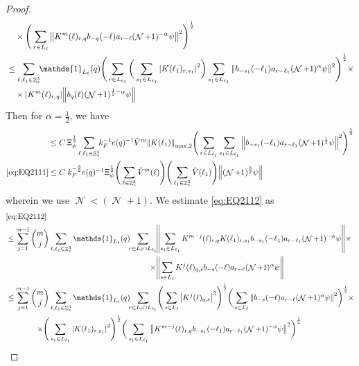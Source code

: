 \documentclass[sn-mathphys, Numbered ,a4paper]{sn-jnl}%
\DeclareMathOperator{\Z}{\mathbb{Z}}
\DeclareMathOperator{\NN}{\mathcal{N}}
\newcommand{\half}{\frac{1}{2}}
\theoremstyle{plain}
\theoremstyle{definition}
\theoremstyle{remark}
\theoremstyle{plain}
\theoremstyle{definition}
\theoremstyle{remark}
\begin{document}
\begin{proof}
\begin{align}
 	&\quad \times \Bigg( \sum\limits_{r \in L_\ell}  \norm{  K^{m}(\ell)_{r,q}  b_{-q}(-\ell) a_{r-\ell} (\NN+1)^{-\alpha}\psi }^2\Bigg)^\half \nonumber\\
 	&\leq \sum\limits_{\ell,\ell_1 \in \Z^3_*} \!\!\mathds{1}_{L_\ell}(q) \Bigg( \sum\limits_{r \in L_{\ell_1}} \bigg( \sum\limits_{s_1 \in L_{\ell_1}}\abs{K(\ell_1)_{r,s_1}}^2\bigg) \sum\limits_{s_1 \in L_{\ell_1}} \norm{ b_{-s_1}(-\ell_1)  a_{r-\ell_1} (\NN+1)^{\alpha}\psi}^2\Bigg)^\half \times\nonumber\\
 	&\quad \times  \abs{  K^{m}(\ell)_{r,q}} \norm{b_{q}(\ell) (\NN+1)^{\half-\alpha}\psi } \nonumber\\
\end{align}
	Then for $\alpha = \half$, we have 
\begin{align}
 	&\leq C\,\Xi_{\psi}^\half \sum\limits_{\ell,\ell_1 \in \Z^3_*} \!\! k_F^{-1} e(q)^{-1} \hat{V}^{m} \norm{K(\ell_1)}_{\mathrm{max,2}}  \Bigg( \sum\limits_{r \in L_{\ell_1}} \sum\limits_{s_1 \in L_{\ell_1}} \norm{ b_{-s_1}(-\ell_1)  a_{r-\ell_1} (\NN+1)^{\half}\psi}^2\Bigg)^\half \nonumber\\
 	\eqref{eq:EQ2111}&\leq C\; k_F^{-\frac{3}{2}} e(q)^{-1} \Xi_{\psi}^\half \Bigg(\sum\limits_{\ell \in \Z^3_*}  \hat{V}^{m}(\ell)\Bigg) \Bigg(\sum\limits_{\ell_1 \in \Z^3_*} \hat{V}(\ell_1) \Bigg) \norm{ (\NN+1)^{\frac{3}{2}}\psi}  \label{eq:estEQ2111} 
 \end{align}
 wherein we use $\NN<(\NN+1)$. We estimate \eqref{eq:EQ2112} as 
  \begin{alignat}{2}
  	&\eqref{eq:EQ2112}\nonumber\\
  	&\leq \sum\limits_{j=1}^{m-1} {{m}\choose j} \sum\limits_{\ell, \ell_1\in \Z^3_*} \mathds{1}_{L_{\ell}}(q)\!\! \begin{aligned}[t]
  	\sum\limits_{r\in L_{\ell} \cap L_{\ell_1}}\! &\norm{  \sum\limits_{s_1 \in L_{\ell_1}} K^{m-j}(\ell)_{r,q} K(\ell_1)_{r,s_1} b_{-s_1}(-\ell_1) a_{r-\ell_1} (\NN+1)^{-\alpha}\psi}\times\nonumber \\\times &\norm{\sum\limits_{s \in L_\ell} K^{j}(\ell)_{q,s}  b_{-s}(-\ell)  a_{r-\ell} (\NN+1)^{\alpha}\psi }
  	\end{aligned} \nonumber\\
    &\leq \sum\limits_{j=1}^{m-1} \begin{aligned}[t] {{m}\choose j} &\sum\limits_{\ell, \ell_1\in \Z^3_*} \mathds{1}_{L_{\ell}}(q)\!\! 
    \sum\limits_{r\in L_{\ell} \cap L_{\ell_1}}\! \Bigg( \sum\limits_{s \in L_\ell} \abs{K^{j}(\ell)_{q,s}}^2\Bigg)^\half \bigg( \sum\limits_{s \in L_\ell}\norm{  b_{-s}(-\ell) a_{r-\ell} (\NN+1)^{\alpha}\psi}^2\bigg)^\half \times\nonumber\\ \times \Bigg( &\sum\limits_{s_1 \in L_{\ell_1}}\abs{K(\ell_1)_{r,s_1}}^2\Bigg)^\half \bigg(\sum\limits_{s_1 \in L_{\ell_1}}\norm{ K^{m-j}(\ell)_{r,q}  b_{-s_1}(-\ell_1)  a_{r-\ell_1} (\NN+1)^{-\alpha}\psi }^2\bigg)^\half

\end{aligned}
\end{alignat}
\end{proof}
\end{document}
